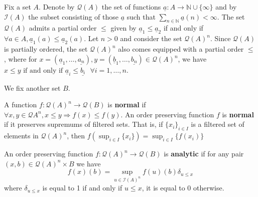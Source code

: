 \documentclass[runningheads]{llncs}
\newcommand{\bb}[1]{\mathbb{#1}}
\newcommand{\call}[1]{\mathcal{#1}}
\newcommand{\Ical}{\call{I}}
\newcommand{\Qcal}{\call{Q}}
\newcommand{\lto}{\longrightarrow}
\begin{document}
Fix a set $A$. Denote by $\Qcal(A)$ the set of functions $\underline{a}: A \lto \bb{N} \cup \{ \infty \}$ and by $\Ical(A)$ the subset consisting of those $\underline{a}$ such that $\sum_{n \in \bb{N}}\underline{a}(n) < \infty$. The set $\Qcal(A)$ admits a partial order $\leq$ given by $\underline{a}_1 \leq \underline{a}_2$ if and only if $\forall a \in A, \underline{a}_1(a) \leq \underline{a}_2(a)$. Let $n > 0$ and consider the set $\Qcal(A)^n$. Since $\Qcal(A)$ is partially ordered, the set $\Qcal(A)^n$ also comes equipped with a partial order $\leq$, where for $x = (\underline{a}_1, \ldots, \underline{a_n}), y = (\underline{b}_1, \ldots, \underline{b_n}) \in \Qcal(A)^n$, we have $x \leq y\text{ if and only if }\underline{a}_i \leq \underline{b_i}\text{  }\forall i = 1, \ldots, n$.
	
	We fix another set $B$.
	
	\begin{definition}\label{def:normal}
		A function $f: \Qcal(A)^n \lto \Qcal(B)$ is \textbf{normal} if $\forall x,y \in \Qcal{A}^n, x \leq y \Rightarrow f(x) \leq f(y)$. An order preserving function $f$ is \textbf{normal} if it preserves supremums of filtered sets. That is, if $\{ x_i \}_{i \in I}$ is a filtered set of elements in $\Qcal(A)^n$, then $f(\operatorname{sup}_{i \in I} \{ x_i \}) = \operatorname{sup}_{i \in I}\{ f(x_i) \}$
	\end{definition}

\begin{definition}
	An order preserving function $f: \Qcal(A)^n \lto \Qcal(B)$ is \textbf{analytic} if for any pair $(x, b) \in \Qcal(A)^n \times B$ we have
	\begin{equation}
		f(x)(b) = \operatorname{sup}_{u \in \Ical(A)^n}f(u)(b)\delta_{u \leq x}
	\end{equation}
	where $\delta_{u \leq x}$ is equal to 1 if and only if $u \leq x$, it is equal to 0 otherwise.
	\end{definition}
\end{document}

